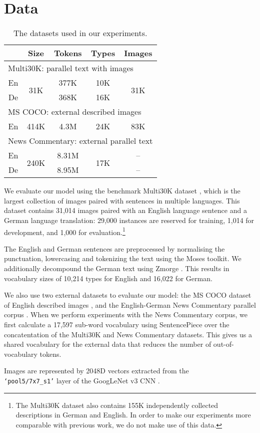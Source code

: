 \section{Data}\label{sec:data}

\begin{table}
\renewcommand{\arraystretch}{1.3}
\centering
\begin{tabular}{ccccc}
\toprule
& Size & Tokens & Types & Images\\
\midrule
\multicolumn{5}{l}{Multi30K: parallel text with images}\\
En & \multirow{2}{*}{31K} & 377K & 10K & \multirow{2}{*}{31K}\\
De & & 368K & 16K & \\
\midrule
\multicolumn{5}{l}{MS COCO: external described images}\\
En    & 414K & 4.3M & 24K & 83K \\
\midrule
\multicolumn{5}{l}{News Commentary: external parallel text}\\
En   & \multirow{2}{*}{240K} & 8.31M & \multirow{2}{*}{17K} &  --\\
De   & & 8.95M & & --\\
\bottomrule
\end{tabular}
\caption{The datasets used in our experiments.}\label{tab:datasets}
\end{table}

We evaluate our model using the benchmark Multi30K dataset \citep{W16-3210}, which is the largest collection of images paired with sentences in multiple languages. This dataset contains 31,014 images paired with an English language sentence and a German language translation: 29,000 instances are reserved for training, 1,014 for development, and 1,000 for evaluation.\footnote{The Multi30K dataset also contains 155K independently collected descriptions in German and English. In order to make our experiments more comparable with previous work, we do not make use of this data.}

The English and German sentences are preprocessed by normalising the punctuation, lowercasing and tokenizing the text using the Moses toolkit. We additionally decompound the German text  using Zmorge \cite{Sennrich2014}. This results in vocabulary sizes of 10,214 types for English and 16,022 for German.

We also use two external datasets to evaluate our model: the MS COCO dataset of English described images \cite{Chen2015}, and the English-German News Commentary parallel corpus \citep{Tiedemann2012}. When we perform experiments with the News Commentary corpus, we first calculate a 17,597 sub-word vocabulary using SentencePiece \citep{Schuster2012} over the concatentation of the Multi30K and News Commentary datasets. This gives us a shared vocabulary for the external data that reduces the number of out-of-vocabulary tokens. 

Images are represented by 2048D vectors extracted from the  \\ \texttt{`pool5/7x7\_s1'} 
layer of the GoogLeNet v3 CNN \citep{Szegedy2015}.